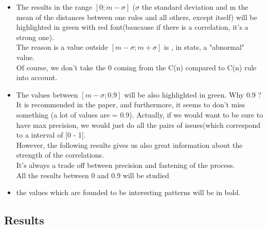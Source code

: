 \documentclass{article}
\begin{document}
\begin{itemize}

\item The results in the range $[0 ; m-\sigma]$ ($\sigma$ the standard deviation and m the mean of the distances between one rules and all others, except itself) will be highlighted in green with red font(baucause if there is a correlation, it's a strong one). \\
The reason is a value outside $[m-\sigma ; m+\sigma]$ is , in stats, a "abnormal" value. \\ Of course, we don't take the 0 coming from the C(n) compared to C(n) rule into account. \\ 

\item The values between $[m-\sigma;0.9]$ will be also highlighted in green. Why 0.9 ? It is recommended in the paper, and furthermore, it seems to don't miss something (a lot of values are = 0.9). Actually, if we would want to be sure to have max precision, we would just do all the pairs of issues(which correspond to a interval of [0 - 1]. \\ However, the following results gives us also great information about the strength of the correlations. \\
It's always a trade off between precision and fastening of the process. \\

All the results between 0 and 0.9 will be studied \\

\item the values which are founded to be interesting patterns will be in bold.

\end{itemize}

\subsection{Results} 
\end{document}
